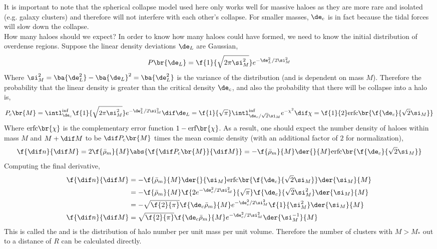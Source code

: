 \documentclass{article}
\begin{document}
It is important to note that the spherical collapse model used here only works well for massive haloes as they are more rare and isolated (e.g. galaxy clusters) and therefore will not interfere with each other's collapse. For smaller masses, $\de_c$ is in fact  because the tidal forces will slow down the collapse.\\

How many haloes should we expect? In order to know how many haloes could have formed, we need to know the initial distribution of overdense regions. Suppose the linear density deviations $\de_{L}$ are Gaussian,
\[ P\br{\de_L} = \f{1}{\sqrt{2 \pi \si_{M}^2}}e^{-{\de_L^2}/{2 \si_M^2}} \]
Where $\si_M^2 = \ba{\de_L^2} - \ba{\de_L}^2 = \ba{\de_L^2}$ is the variance of the distribution (and is dependent on mass $M$). Therefore the probability that the linear density is greater than the critical density $\de_c$, and also the probability that there will be collapse into a halo is,
\[ P_c\br{M} = \intl_{\de_c}^{\inf} \f{1}{\sqrt{2 \pi \si_{M}^2}}e^{-{\de_L^2}/{2 \si_M^2}} \dif \de_L = \f{1}{\sqrt{\pi}}\intl_{{\de_c / \sqrt{2} \si_M}}^{\inf} e^{-\chi^2} \dif \chi = \f{1}{2} \text{erfc}\br{\f{\de_c}{\sqrt{2} \si_M}}\]
Where $\text{erfc}\br{\chi}$ is the complementary error function $1 - \text{erf}\br{\chi}$. As a result, one should expect the number density of haloes within mass $M$ and $M + \dif M$ to be $\dif P_c\br{M}$ times the mean cosmic density (with an additional factor of $2$ for normalization),
\[ \f{\dif n}{\dif M} = 2 \f{\bar \rho_m}{M} \abs{\f{\dif P_c\br{M}}{\dif M}} = -\f{\bar \rho_m}{M}\der{}{M}\text{erfc}\br{\f{\de_c}{\sqrt{2} \si_M}} \]
Computing the final derivative,
\begin{align*}
\f{\dif n}{\dif M}
&= -\f{\bar \rho_m}{M}\der{}{\si_M}\text{erfc}\br{\f{\de_c}{\sqrt{2} \si_M}}\der{\si_M}{M} \\
&= -\f{\bar \rho_m}{M}\f{2e^{-{\de_c^2}/{2 \si_M^2}}}{\sqrt{\pi}}\f{\de_c}{\sqrt{2} \si_M^2}\der{\si_M}{M} \\
&= -\sqrt{\f{2}{\pi}}\f{\de_c\bar \rho_m}{M} e^{-{\de_c^2}/{2 \si_M^2}} \f{1}{\si_M^2} \der{\si_M}{M} \\
\f{\dif n}{\dif M} &= \sqrt{\f{2}{\pi}}\f{\de_c\bar \rho_m}{M} e^{-{\de_c^2}/{2 \si_M^2}} \der{\si_M^{-1}}{M}
\end{align*}
This is called the  and is the distribution of halo number per unit mass per unit volume. Therefore the number of clusters with $M > M_{*}$ out to a distance of $R$ can be calculated directly.
\end{document}
